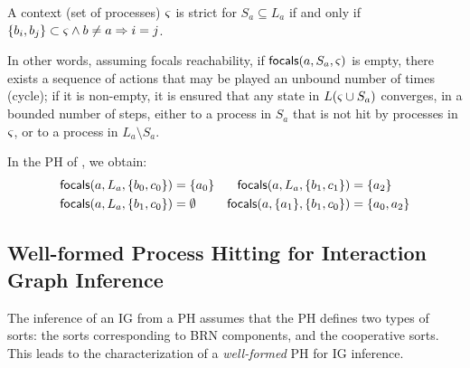 \begin{comment}
\begin{property}[$\focals$ reachability]\label{pro:focals-reach}
$\focals(a,S_a,\ctx)$ is reachable if and only if 
$\forall s\in L(\ctx\cup S_a)$,
if $\exists h\in \PHa(S_a,\ctx)$ with $\PHtarget(h)\in s$,
there exists a (possibly empty) sequence of actions
$h^1,\dots,h^n \in \PHa(\ctx\cup S_a)$
	such that $h^1,\dots,h^n,h$ are successively playable in $s$;
where $\PHa(\ctx) \DEF \{ \PHfrappe{b_i}{c_j}{c_k}\in\PHa \mid c\neq a \wedge
			b\in \PHsort(\ctx) \Rightarrow b_i\in \ctx \wedge c\in\PHsort(\ctx) \Rightarrow
			c_i\in\ctx \}$.
\end{property}
\end{comment}

\begin{definition}\label{def:strict-ctx}
A context (set of processes) $\varsigma$ is strict for $S_a\subseteq L_a$ if and only if
$\{b_i,b_j\} \subset \varsigma \wedge b\neq a \Rightarrow i=j$.
\end{definition}

In other words, assuming focals reachability, if $\mathsf{focals}(a,S_a,\varsigma)$ is empty, there exists a
sequence of actions that may be played an unbound number of times (cycle);
if it is non-empty, it is ensured that any state in $L(\varsigma\cup S_a)$ converges, in a bounded
number of steps, either to a process in $S_a$ that is not hit by processes in $\varsigma$, or to a process in
$L_a\setminus S_a$.

\begin{example*}
In the PH of , we obtain:
\begin{align*}
\mathsf{focals}(a,L_a,\{b_0,c_0\}) &= \{ a_0 \}
&
\mathsf{focals}(a,L_a,\{b_1,c_1\}) &= \{ a_2 \}
\\
\mathsf{focals}(a,L_a,\{b_1,c_0\}) &= \emptyset
&
\mathsf{focals}(a,\{a_1\},\{b_1,c_0\}) &= \{ a_0, a_2 \}
\end{align*}
\end{example*}

\subsection{Well-formed Process Hitting for Interaction Graph Inference}\label{ssec:wf}

The inference of an IG from a PH assumes that the PH defines two types of sorts:
the sorts corresponding to BRN components, and the cooperative sorts.
This leads to the characterization of a \emph{well-formed} PH for IG inference.

